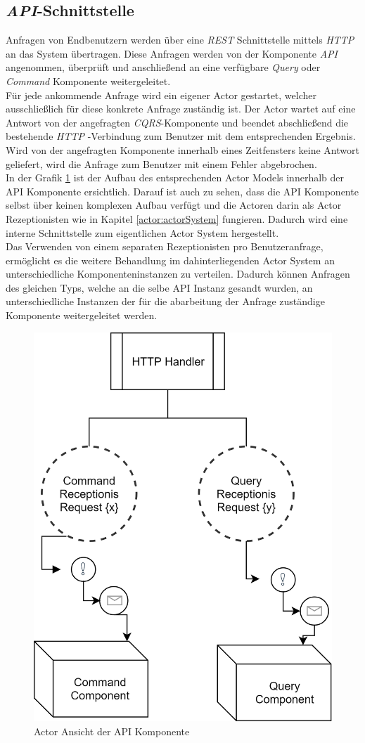 \subsection{\textit{API}-Schnittstelle}
\label{subsec:implementation:apiComponente}
Anfragen von Endbenutzern werden über eine \textit{REST} Schnittstelle mittels \textit{HTTP} an das System übertragen. Diese Anfragen werden von der Komponente \textit{API} angenommen, überprüft und anschließend an eine verfügbare \textit{Query} oder \textit{Command} Komponente weitergeleitet. \\
Für jede ankommende Anfrage wird ein eigener Actor gestartet, welcher ausschließlich für diese konkrete Anfrage zuständig ist. Der Actor wartet auf eine Antwort von der angefragten \textit{CQRS}-Komponente und beendet abschließend die bestehende \textit{HTTP} -Verbindung zum Benutzer mit dem entsprechenden Ergebnis. Wird von der angefragten Komponente innerhalb eines Zeitfensters keine Antwort geliefert, wird die Anfrage zum Benutzer mit einem Fehler abgebrochen. \\
In der Grafik \ref{fig:implementation:apiActorModel} ist der Aufbau des entsprechenden Actor Models innerhalb der API Komponente ersichtlich. Darauf ist auch zu sehen, dass die API Komponente selbst über keinen komplexen Aufbau verfügt und die Actoren darin als Actor Rezeptionisten wie in Kapitel \ref{actor:actorSystem} fungieren. Dadurch wird eine interne Schnittstelle zum eigentlichen Actor System hergestellt. \\
Das Verwenden von einem separaten Rezeptionisten pro Benutzeranfrage, ermöglicht es die weitere Behandlung im dahinterliegenden Actor System an unterschiedliche Komponenteninstanzen zu verteilen. Dadurch können Anfragen des gleichen Typs, welche an die selbe API Instanz gesandt wurden,  an unterschiedliche Instanzen der für die abarbeitung der Anfrage zuständige Komponente weitergeleitet werden. 
\begin{figure}
    \centering
    \includegraphics[width=0.5\linewidth]{gfx/implementation/apiActorModel}
    \caption{Actor Ansicht der API Komponente}
    \label{fig:implementation:apiActorModel}
\end{figure} 

